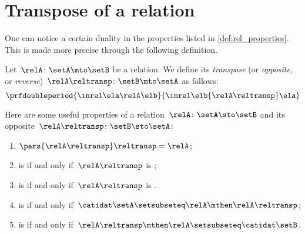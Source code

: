 
\section{Transpose of a relation}

One can notice a certain duality in the properties listed in \cref{def:rel_properties}.
This is made more precise through the following definition.

\begin{ctdefinition}
    \label{def:relation-transpose}
    Let~$\relA\colon \setA\mto \setB$ be a relation.
    We define its \emph{transpose} (or \emph{opposite}, or \emph{reverse})~$\relA\reltransp\colon \setB \mto \setA$ as follows:
    \begin{equation}
        \prfdoubleperiod{
            \inrel \ela \relA \elb
        }{
            \inrel \elb {\relA\reltransp} \ela
        }
    \end{equation}
\end{ctdefinition}
\begin{remark}
    \label{re:rel-op-properties}
    Here are some useful properties of a relation~$\relA\colon \setA \sto \setB$ and its opposite~$\relA\reltransp\colon \setB \sto \setA$:
    \begin{enumerate}
        \item $\pars{\relA\reltransp} \reltransp = \relA $;
        \item \relA is  if and only if~$\relA\reltransp$ is ;
        \item \relA is  if and only if~$\relA\reltransp$ is .
        \item \relA is  if and only if~$\catidat\setA\setsubseteq \relA \mthen \relA\reltransp$;
        \item \relA is  if and only if~$\relA\reltransp\mthen \relA\setsubseteq \catidat\setB$.
    \end{enumerate}
\end{remark}

\begin{marginfigure}
    \centering
    \caption{}
    \label{fig:rel_transpose}
\end{marginfigure}

